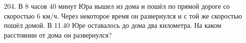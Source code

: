 204. В 8 часов 40 минут Юра вышел из дома и пошёл по прямой дороге со скоростью 6 км/ч. Через некоторое время он развернулся и с той же скоростью пошёл домой. В 11.40 Юре оставалось до дома два километра. На каком расстоянии от дома он развернулся?\\
